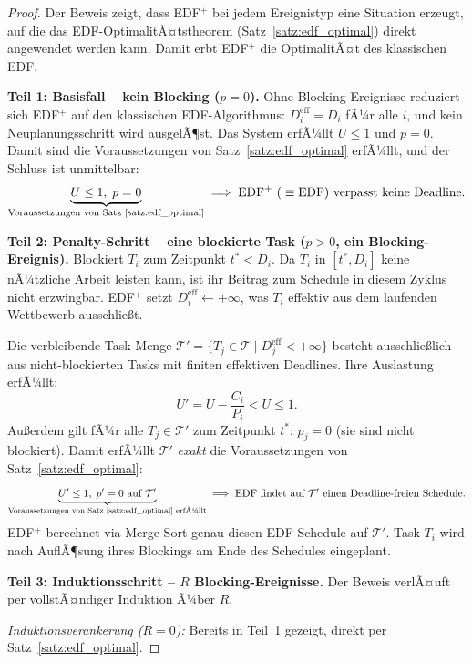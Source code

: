 ﻿\documentclass[a4paper,12pt]{article}
\theoremstyle{definition}
\begin{document}
	\begin{proof}
		Der Beweis zeigt, dass EDF$^+$ bei jedem Ereignistyp eine Situation erzeugt,
		auf die das EDF-OptimalitÃ¤tstheorem (Satz~\ref{satz:edf_optimal}) direkt
		angewendet werden kann. Damit erbt EDF$^+$ die OptimalitÃ¤t des
		klassischen EDF.

		\medskip
		\textbf{Teil 1: Basisfall -- kein Blocking ($p = 0$).}
		Ohne Blocking-Ereignisse reduziert sich EDF$^+$ auf den klassischen
		EDF-Algorithmus: $D_i^{\text{eff}} = D_i$ fÃ¼r alle $i$,
		und kein Neuplanungsschritt wird ausgelÃ¶st. Das System erfÃ¼llt
		$U \le 1$ und $p = 0$. Damit sind die Voraussetzungen von
		Satz~\ref{satz:edf_optimal} erfÃ¼llt, und der Schluss ist unmittelbar:
		\[
		\underbrace{U \le 1,\; p = 0}_{\text{Voraussetzungen von Satz~\ref{satz:edf_optimal}}}
		\;\Longrightarrow\;
		\text{EDF$^+$ (}\equiv \text{EDF) verpasst keine Deadline.}
		\]

		\medskip
		\textbf{Teil 2: Penalty-Schritt -- eine blockierte Task ($p > 0$,
		ein Blocking-Ereignis).}
		Blockiert $T_i$ zum Zeitpunkt $t^* < D_i$.
		Da $T_i$ in $[t^*, D_i]$ keine nÃ¼tzliche Arbeit leisten kann,
		ist ihr Beitrag zum Schedule in diesem Zyklus nicht erzwingbar.
		EDF$^+$ setzt $D_i^{\text{eff}} \leftarrow +\infty$, was $T_i$
		effektiv aus dem laufenden Wettbewerb ausschlie\ss{}t.

		Die verbleibende Task-Menge
		$\mathcal{T}' = \{T_j \in \mathcal{T} \mid D_j^{\text{eff}} < +\infty\}$
		besteht ausschlie\ss{}lich aus nicht-blockierten Tasks mit finiten
		effektiven Deadlines. Ihre Auslastung erfÃ¼llt:
		\[
		U' = U - \frac{C_i}{P_i} < U \le 1.
		\]
		Au\ss{}erdem gilt fÃ¼r alle $T_j \in \mathcal{T}'$ zum Zeitpunkt $t^*$:
		$p_j = 0$ (sie sind nicht blockiert).
		Damit erfÃ¼llt $\mathcal{T}'$ \emph{exakt} die Voraussetzungen von
		Satz~\ref{satz:edf_optimal}:
		\[
		\underbrace{U' \le 1,\; p' = 0 \text{ auf } \mathcal{T}'}_{%
		\text{Voraussetzungen von Satz~\ref{satz:edf_optimal} erfÃ¼llt}}
		\;\Longrightarrow\;
		\text{EDF findet auf } \mathcal{T}' \text{ einen Deadline-freien Schedule.}
		\]
		EDF$^+$ berechnet via Merge-Sort genau diesen EDF-Schedule auf $\mathcal{T}'$.
		Task $T_i$ wird nach AuflÃ¶sung ihres Blockings am Ende des Schedules
		eingeplant.

		\medskip
		\textbf{Teil 3: Induktionsschritt -- $R$ Blocking-Ereignisse.}
		Der Beweis verlÃ¤uft per vollstÃ¤ndiger Induktion Ã¼ber $R$.

		\emph{Induktionsverankerung ($R = 0$):} Bereits in Teil~1 gezeigt,
		direkt per Satz~\ref{satz:edf_optimal}.


\end{proof}
\end{document}

